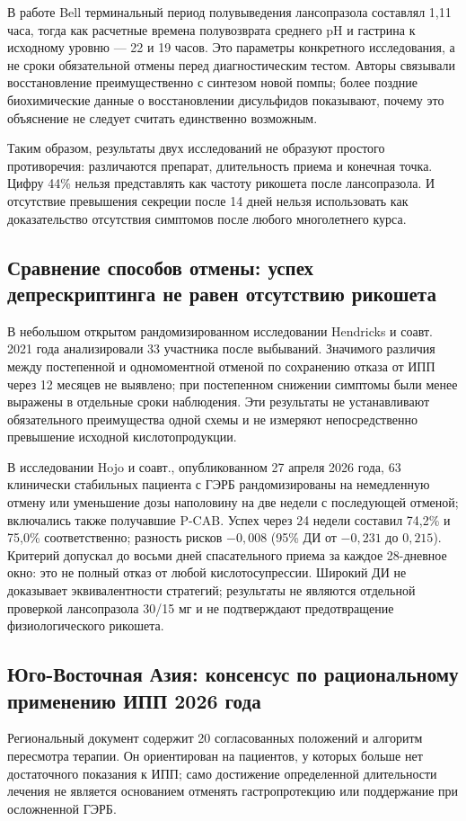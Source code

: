 \documentclass[11pt,a4paper,notitlepage]{report}
\newcommand{\src}[1]{\unskip\space\cite{#1}}
\begin{document}
В работе Bell терминальный период полувыведения лансопразола составлял 1,11 часа, тогда как расчетные времена полувозврата среднего pH и гастрина к исходному уровню --- 22 и 19 часов. Это параметры конкретного исследования, а не сроки обязательной отмены перед диагностическим тестом. Авторы связывали восстановление преимущественно с синтезом новой помпы; более поздние биохимические данные о восстановлении дисульфидов показывают, почему это объяснение не следует считать единственно возможным.\src{withdrawbell,molrestore}

Таким образом, результаты двух исследований не образуют простого противоречия: различаются препарат, длительность приема и конечная точка. Цифру 44\% нельзя представлять как частоту рикошета после лансопразола. И отсутствие превышения секреции после 14 дней нельзя использовать как доказательство отсутствия симптомов после любого многолетнего курса.\src{withdrawbell,withdrawniklasson}

\subsection*{Сравнение способов отмены: успех депрескриптинга не равен отсутствию рикошета}
В небольшом открытом рандомизированном исследовании Hendricks и соавт. 2021 года анализировали 33 участника после выбываний. Значимого различия между постепенной и одномоментной отменой по сохранению отказа от ИПП через 12 месяцев не выявлено; при постепенном снижении симптомы были менее выражены в отдельные сроки наблюдения. Эти результаты не устанавливают обязательного преимущества одной схемы и не измеряют непосредственно превышение исходной кислотопродукции.\src{withdrawhendricks2021}

В исследовании Hojo и соавт., опубликованном 27 апреля 2026 года, 63 клинически стабильных пациента с ГЭРБ рандомизированы на немедленную отмену или уменьшение дозы наполовину на две недели с последующей отменой; включались также получавшие P-CAB. Успех через 24 недели составил 74,2\% и 75,0\% соответственно; разность рисков $-0{,}008$ (95\% ДИ от $-0{,}231$ до $0{,}215$). Критерий допускал до восьми дней спасательного приема за каждое 28-дневное окно: это не полный отказ от любой кислотосупрессии. Широкий ДИ не доказывает эквивалентности стратегий; результаты не являются отдельной проверкой лансопразола 30/15 мг и не подтверждают предотвращение физиологического рикошета.\src{withdrawhojo2026}

\subsection{Юго-Восточная Азия: консенсус по рациональному применению ИПП 2026 года}
Региональный документ содержит 20 согласованных положений и алгоритм пересмотра терапии. Он ориентирован на пациентов, у которых больше нет достаточного показания к ИПП; само достижение определенной длительности лечения не является основанием отменять гастропротекцию или поддержание при осложненной ГЭРБ.\src{seadepres2026,agadepres}
\end{document}
